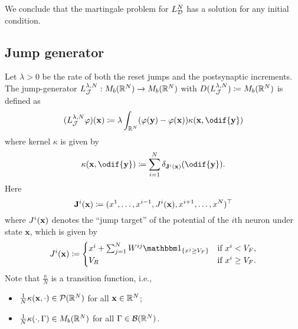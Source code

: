 \smallskip

We conclude that the martingale problem for \(L_{\mathcal{D}}^N\) has a solution for any initial condition.


\subsection{Jump generator}
Let \(\lambda > 0\) be the rate of both the reset jumps and the postsynaptic increments.
The jump-generator \(L_{\mathcal{J}}^{\lambda, N} : M_b(\mathbb{R}^N) \to M_b(\mathbb{R}^N)\) with \( D( L_{\mathcal{J}}^{\lambda, N} ) \coloneqq M_b(\mathbb{R}^N) \) is defined as
\begin{equation}
  (L_{\cJ}^{\lambda, N}\varphi) (\bm{x}) \coloneqq \lambda \int_{\potspace^N} \br{\varphi(\bm{y}) - \varphi(\bm{x})} \kappa(\bm{x}, \odif{\bm{y}})
\end{equation}
where kernel \( \kappa \) is given by
\begin{equation}
  \kappa(\bm{x},\odif{\bm{y}}) \coloneqq \sum_{i=1}^N \delta_{\bm{\jtarg}^i(\bm{x})}(\odif{\bm{y}}).
\end{equation}
Here
\begin{equation}
  \mathbf{J}^i(\mathbf{x}) \coloneqq (x^1,\dots,x^{i-1},J^i(\mathbf{x}),x^{i+1},\dots,x^N)^\top
\end{equation}
where \(J^i(\mathbf{x})\) denotes the \enquote{jump target} of the potential of the \(i\)th neuron under state \(\bm{x}\), which is given by
\begin{equation}
  \jtarg^i(\bm{x})
  \coloneqq \begin{cases}
    x^i + \sum_{j=1}^N W^{ij} \ind{x^j \geq V_F} & \text{if } x^i < V_F,    \\
    V_R                                               & \text{if } x^i \geq V_F.
  \end{cases}
\end{equation}
Note that \(\frac{\kappa}{N}\) is a transition function, i.e.,
\begin{itemize}
  \item \(\frac{1}{N} \kappa(\mathbf{x},\cdot) \in \mathcal{P}(\mathbb{R}^N)\) for all \(\mathbf{x} \in \mathbb{R}^N\);
  \item \(\frac{1}{N} \kappa(\cdot, \Gamma) \in M_b(\mathbb{R}^N)\) for all \(\Gamma \in \mathcal{B}(\mathbb{R}^N)\).
\end{itemize}


